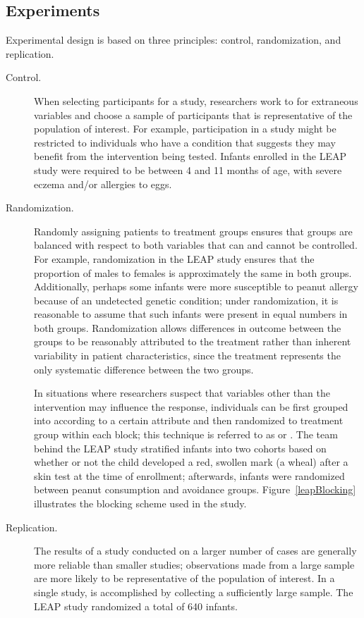 \subsection[Experiments]{Experiments}
\label{experiments}

Experimental design is based on three principles: control, randomization, and replication.


\begin{description}

	\item[Control.] When selecting participants for a study, researchers work to  for extraneous variables and choose a sample of participants that is representative of the population of interest. For example, participation in a study might be restricted to individuals who have a condition that suggests they may benefit from the intervention being tested. Infants enrolled in the LEAP study were required to be between 4 and 11 months of age, with severe eczema and/or allergies to eggs.

	\item[Randomization.] Randomly assigning patients to treatment groups ensures that groups are balanced with respect to both variables that can and cannot be controlled. For example, randomization in the LEAP study ensures that the proportion of males to females is approximately the same in both groups. Additionally, perhaps some infants were more susceptible to peanut allergy because of an undetected genetic condition; under randomization, it is reasonable to assume that such infants were present in equal numbers in both groups. Randomization allows differences in outcome between the groups to be reasonably attributed to the treatment rather than inherent variability in patient characteristics, since the treatment represents the only systematic difference between the two groups. 
	
	In situations where researchers suspect that variables other than the intervention may influence the response, individuals can be first grouped into  according to a certain attribute and then randomized to treatment group within each block; this technique is referred to as  or . The team behind the LEAP study stratified infants into two cohorts based on whether or not the child developed a red, swollen mark (a wheal) after a skin test at the time of enrollment; afterwards, infants were randomized between peanut consumption and avoidance groups. Figure~\ref{leapBlocking} illustrates the blocking scheme used in the study. 

	\item[Replication.] The results of a study conducted on a larger number of cases are generally more reliable than smaller studies; observations made from a large sample are more likely to be representative of the population of interest. In a single study,  is accomplished by collecting a sufficiently large sample. The LEAP study randomized a total of 640 infants.

\end{description}

